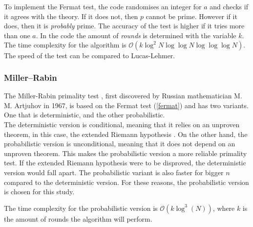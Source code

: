 \documentclass[main.tex]{subfiles}
\begin{document}
To implement the Fermat test, the code randomises an integer for $a$ and checks
if it agrees with the theory. If it does not, then $p$ cannot be prime. However
if it does, then it is \emph{probably} prime. The accuracy of the test is higher
if it tries more than one $a$. In the code the amount of \emph{rounds} is
determined with the variable $k$. The time complexity for the algorithm is
$\mathcal{O}(k \log^{2}N \log \log N \log \log \log N)$. The speed of the test
can be compared to Lucas-Lehmer.  \\



\subsubsection{Miller–Rabin} The Miller-Rabin primality test \cite{algh:miller},
first discovered by Russian mathematician M. M. Artjuhov in 1967, is based on
the Fermat test (\ref{fermat}) and has two variants. One that is deterministic, and the other probabilistic. \\

The deterministic version is conditional, meaning that it relies on an unproven
theorem, in this case, the extended Riemann hypothesis \cite{riemann}. On the
other hand, the probabilistic version is unconditional, meaning that it does not
depend on an unproven theorem. This makes the probabilistic version a more
reliable primality test. If the extended Riemann hypothesis were to be
disproved, the deterministic version would fall apart. The probabilistic variant
is also faster for bigger $n$ compared to the deterministic version. For these
reasons, the probabilistic version is chosen for this study. \newline

The time complexity for the probabilistic version is $\mathcal{O}(k
\log^{3}(N))$, where $k$ is the amount of rounds the algorithm will perform. \\


\end{document}
